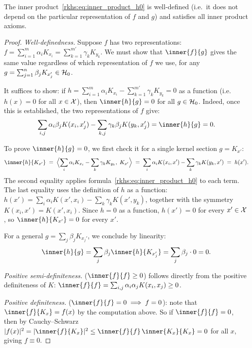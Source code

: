 \begin{notechapter}
\begin{lemma}
\label{rkhs:lem:well_defined}
The inner product~\eqref{rkhs:eq:inner_product_h0} is well-defined (i.e.\ it
does not depend on the particular representation of $f$ and $g$) and
satisfies all inner product axioms.
\end{lemma}

\begin{proof}
\emph{Well-definedness.} Suppose $f$ has two
representations:
$f = \sum_{i=1}^m \alpha_i K_{x_i}
   = \sum_{k=1}^{m'} \gamma_k K_{y_k}$.
We must show that $\inner{f}{g}$ gives the same value
regardless of which representation of $f$ we use, for
any $g = \sum_{j=1}^n \beta_j K_{x_j'} \in \mathcal{H}_0$.

It suffices to show: if
$h = \sum_{i=1}^m \alpha_i K_{x_i}
   - \sum_{k=1}^{m'} \gamma_k K_{y_k} = 0$
as a function (i.e.\ $h(x) = 0$ for all $x \in \mathcal{X}$),
then $\inner{h}{g} = 0$ for all $g \in \mathcal{H}_0$.
Indeed, once this is established, the two
representations of $f$ give:
\[
\sum_{i,j} \alpha_i \beta_j K(x_i, x_j')
- \sum_{k,j} \gamma_k \beta_j K(y_k, x_j')
= \inner{h}{g} = 0.
\]

To prove $\inner{h}{g} = 0$, we first check it for
a single kernel section $g = K_{x'}$:
\[
\inner{h}{K_{x'}}
\;=\; \Bigl\langle \sum_i \alpha_i K_{x_i}
  - \sum_k \gamma_k K_{y_k},\; K_{x'}\Bigr\rangle
\;=\; \sum_i \alpha_i K(x_i, x')
  - \sum_k \gamma_k K(y_k, x')
\;=\; h(x').
\]
The second equality applies
formula~\eqref{rkhs:eq:inner_product_h0} to each term.
The last equality uses the definition of $h$ as
a function: $h(x') = \sum_i \alpha_i K(x', x_i)
- \sum_k \gamma_k K(x', y_k)$, together with the
symmetry $K(x_i, x') = K(x', x_i)$. Since $h = 0$
as a function, $h(x') = 0$ for every $x' \in \mathcal{X}$,
so $\inner{h}{K_{x'}} = 0$ for every $x'$.

For a general $g = \sum_j \beta_j K_{x_j'}$, we
conclude by linearity:
\[
\inner{h}{g}
= \sum_j \beta_j \inner{h}{K_{x_j'}}
= \sum_j \beta_j \cdot 0 = 0.
\]

\medskip
\emph{Positive semi-definiteness.}
($\inner{f}{f} \geq 0$) follows directly from the
positive definiteness of $K$:
$\inner{f}{f} = \sum_{i,j} \alpha_i \alpha_j
K(x_i, x_j) \geq 0$.

\medskip
\emph{Positive definiteness.}
($\inner{f}{f} = 0 \implies f = 0$): note that
$\inner{f}{K_x} = f(x)$ by the computation above.
So if $\inner{f}{f} = 0$, then by Cauchy--Schwarz
$|f(x)|^2 = |\inner{f}{K_x}|^2
\leq \inner{f}{f}\,\inner{K_x}{K_x} = 0$
for all $x$, giving $f \equiv 0$.
\end{proof}


\end{notechapter}
